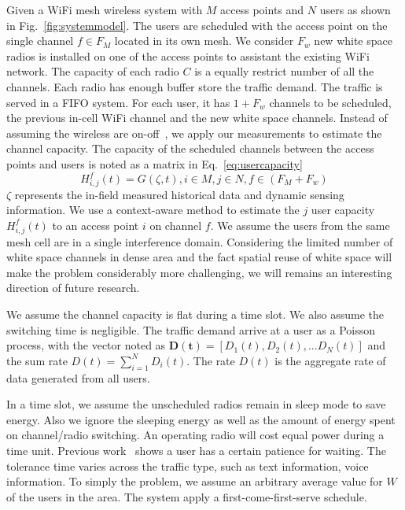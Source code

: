 Given a WiFi mesh wireless system with $M$ access points and $N$ users as shown in Fig.~\ref{fig:systemmodel}. 
The users are scheduled with the access point on the single channel $f \in F_M$ located in its own mesh. 
We consider $F_w$ new white space radios is installed on one of the access points to assistant the existing WiFi 
network. The capacity of each radio $C$ is a equally restrict number of all the channels. 
Each radio has enough buffer store the traffic demand. 
The traffic is served in a FIFO system.
For each user, it 
has $1+F_w$ channels to be scheduled, the previous in-cell WiFi channel and the new white space channels. 
Instead of assuming the wireless are on-off~\cite{bodas2012low}, we apply our measurements to estimate the 
channel capacity. The capacity of the scheduled channels between the access points and users is noted as a 
matrix in Eq.~\ref{eq:usercapacity}
\begin{equation}
\label{eq:usercapacity}
H_{i,j}^f(t)= G(\zeta,t),i \in M, j\in N, f \in (F_M+F_w) 
\end{equation} 
$\zeta$ represents the in-field measured historical data and dynamic sensing information.
We use a context-aware method to estimate the $j$ user capacity $H_{i,j}^f(t)$ to an access point 
$i$ on channel $f$. 
We assume the users from the same mesh cell are in a single interference domain.
Considering the limited number of white space channels in dense area and the fact spatial reuse 
of white space will make the problem considerably more challenging, we will remains an interesting 
direction of future research. 


We assume the channel capacity is flat during a time slot. We also assume the switching time is negligible. 
The traffic demand arrive at a user as a Poisson process, with the vector noted as $\bm{D(t)} = [D_1(t),D_2(t),...D_N(t)]$ 
and the sum rate $D(t) = \sum\limits_{i=1}^N D_i(t)$.  The rate $D(t)$ is the aggregate rate of data 
generated from all users. 



In a time slot, we assume the unscheduled radios remain in sleep mode to save energy. 
Also we ignore the sleeping energy as well as the amount of energy spent on channel/radio 
switching. An operating radio will cost equal power during a time unit. 
Previous work~\cite{niida2010user} shows a user has a certain patience for waiting. 
The tolerance time varies across the traffic type, such as text information, 
voice information. 
To simply the problem, we assume an arbitrary average 
value for $W$ of the users in the area. 
The system apply a first-come-first-serve schedule. 


